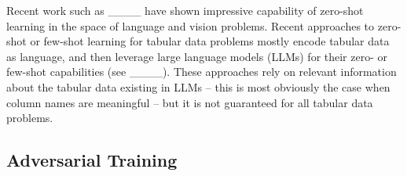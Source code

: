 

Recent work such as ____ have shown impressive capability of zero-shot learning in the space of language and vision problems. Recent approaches to zero-shot or few-shot learning for tabular data problems mostly encode tabular data as language, and then leverage large language models (LLMs) for their zero- or few-shot capabilities (see ____). These approaches rely on relevant information about the tabular data existing in LLMs -- this is most obviously the case when column names are meaningful -- but it is not guaranteed for all tabular data problems.


\subsection{Adversarial Training} 










